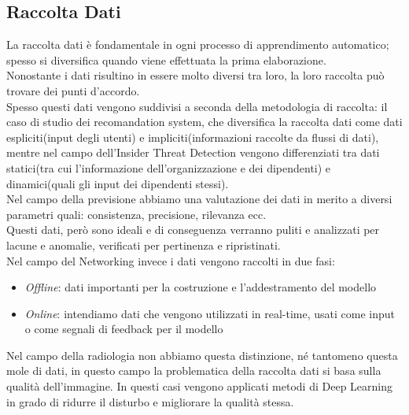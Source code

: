 \documentclass[../tesi.tex]{subfiles}
\begin{document}
\subsection{Raccolta Dati}
La raccolta dati è fondamentale in ogni processo di apprendimento automatico; spesso si diversifica quando viene effettuata la prima elaborazione.\\
Nonostante i dati risultino in essere molto diversi tra loro, la loro raccolta può trovare dei punti d’accordo.\\
Spesso questi dati vengono suddivisi a seconda della metodologia di raccolta: il caso di studio dei recomandation system, che diversifica la raccolta dati come dati espliciti(input degli utenti) e impliciti(informazioni raccolte da flussi di dati), mentre nel campo dell’Insider Threat Detection vengono differenziati tra dati statici(tra cui l’informazione dell’organizzazione e dei dipendenti) e dinamici(quali gli input dei dipendenti stessi).\\
Nel campo della previsione abbiamo una valutazione dei dati in merito a diversi parametri quali: consistenza, precisione, rilevanza ecc. \\
Questi dati, però sono ideali e di conseguenza verranno puliti e analizzati per lacune e anomalie, verificati per pertinenza e ripristinati.\\
Nel campo del Networking invece i dati vengono raccolti in due fasi:
\begin{itemize}
  \item \textit{Offline}: dati importanti per la costruzione e l’addestramento del modello 
  \item \textit{Online}: intendiamo dati che vengono utilizzati in real-time, usati come input o come segnali di feedback per il modello
\end{itemize}
Nel campo della radiologia non abbiamo questa distinzione, né tantomeno questa mole di dati, in questo campo la problematica della raccolta dati si basa sulla qualità dell’immagine. In questi casi vengono applicati metodi di \Gls{Deep Learning} in grado di ridurre il disturbo e migliorare la qualità stessa.
\newpage
\end{document}
